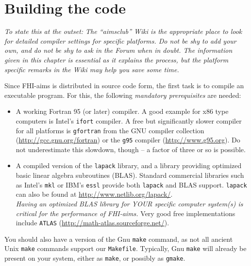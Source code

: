 \section{Building the code}

\emph{To state this at the outset: The ``aimsclub'' Wiki is the
  appropriate place to look for detailed compiler settings for
  specific platforms. Do not be shy to add your own, and do not be shy
  to ask in the Forum when in doubt. The information given in this chapter is
  essential as it explains the process, but the platform specific
  remarks in the Wiki may help you save some time.}

Since FHI-aims is distributed in source code form, the first task is to
compile an executable program. For this, the following \emph{mandatory prerequisites}
are needed:
\begin{itemize}
\item A working Fortran 95 (or later) compiler. A good example for x86 type
  computers is Intel's \texttt{ifort} compiler.  A free but significantly slower
  compiler for all platforms is \texttt{gfortran} from the GNU compiler
  collection (\url{http://gcc.gnu.org/fortran}) or the \texttt{g95}
  compiler (\url{http://www.g95.org}). Do not underestimate this
  slowdown, though -- a factor of three or so is possible.
  \item A compiled version of the \texttt{lapack} library, and a library
    providing optimized basic linear algebra subroutines (BLAS). Standard
    commercial libraries such as Intel's \texttt{mkl} or IBM's \texttt{essl}
    provide both \texttt{lapack} and BLAS support. \texttt{lapack} can also be found at
    \url{http://www.netlib.org/lapack/}. \\
    \emph{Having an optimized BLAS library for YOUR
    specific computer system(s) is critical for the performance of FHI-aims.}
    Very good free implementations include \texttt{ATLAS}
    (\url{http://math-atlas.sourceforge.net/}). 
\end{itemize}
You should also have a version of the Gnu \texttt{make} command, as not all
ancient Unix \texttt{make} commands support our \texttt{Makefile}. Typically, Gnu \texttt{make}
will already be present on your system, either as \texttt{make}, or possibly
as \texttt{gmake}. 

